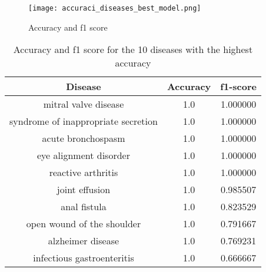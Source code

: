 \begin{figure}[H]
	\centering
	\texttt{[image: accuraci\_diseases\_best\_model.png]}
	\caption{Accuracy and f1 score}\label{fig:acc_diseases}
\end{figure}
\noindent


\begin{table}[H]
	\centering
	\small
	\begin{tabular}{|c|c|c|}
		\hline
		\textbf{Disease}                    & \textbf{Accuracy} & \textbf{f1-score} \\
		\hline
		mitral valve disease                & 1.0               & 1.000000          \\
		syndrome of inappropriate secretion & 1.0               & 1.000000          \\
		acute bronchospasm                  & 1.0               & 1.000000          \\
		eye alignment disorder              & 1.0               & 1.000000          \\
		reactive arthritis                  & 1.0               & 1.000000          \\
		joint effusion                      & 1.0               & 0.985507          \\
		anal fistula                        & 1.0               & 0.823529          \\
		open wound of the shoulder          & 1.0               & 0.791667          \\
		alzheimer disease                   & 1.0               & 0.769231          \\
		infectious gastroenteritis          & 1.0               & 0.666667          \\
		\hline
	\end{tabular}
	\caption{Accuracy and f1 score for the 10 diseases with the highest accuracy}
	\label{best}
\end{table}



